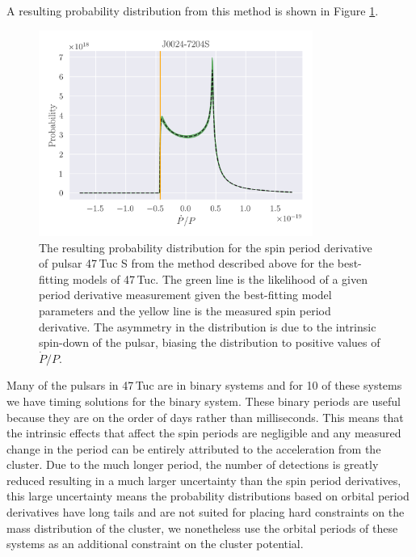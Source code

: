 A resulting probability distribution from this method is shown in Figure
\ref{fig:pulsar-likelihood}.

\begin{figure}
    \centering
    \includegraphics[width=0.8\textwidth]{figures/pulsar-likelihood.png}
    \caption{The resulting probability distribution for the spin period derivative of pulsar 47\,Tuc S
        from the method described above for the best-fitting models of 47\,Tuc. The green line is the
        likelihood of a given period derivative measurement given the best-fitting model parameters and
        the yellow line is the measured spin period derivative. The asymmetry in the distribution is due
        to the intrinsic spin-down of the pulsar, biasing the distribution to positive values of
        $\dot{P}/P$.}
    \label{fig:pulsar-likelihood}
\end{figure}

Many of the pulsars in 47\,Tuc are in binary systems and for 10 of these systems we have timing
solutions for the binary system. These binary periods are useful because they are on the order of
days rather than milliseconds. This means that the intrinsic effects that affect the spin periods
are negligible and any measured change in the period can be entirely attributed to the acceleration
from the cluster. Due to the much longer period, the number of detections is greatly reduced
resulting in a much larger uncertainty than the spin period derivatives, this large uncertainty
means the probability distributions based on orbital period derivatives have long tails and are not
suited for placing hard constraints on the mass distribution of the cluster, we nonetheless use the
orbital periods of these systems as an additional constraint on the cluster potential.


